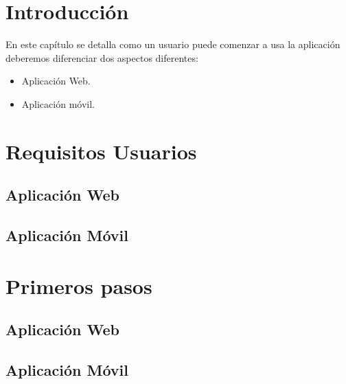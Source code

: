 
\section{Introducción}\label{introduccion-usuario}
En este capítulo se detalla como un usuario puede comenzar a usa la aplicación 
deberemos diferenciar dos aspectos diferentes:

\begin{itemize}
\tightlist
\item
  Aplicación Web.
\item
  Aplicación móvil.
\end{itemize}

\section{Requisitos Usuarios}

\subsection{Aplicación Web}\label{aweb}

\subsection{Aplicación Móvil}\label{amovil}

\section{Primeros pasos}

\subsection{Aplicación Web}\label{aweb}

\subsection{Aplicación Móvil}\label{amovil}





